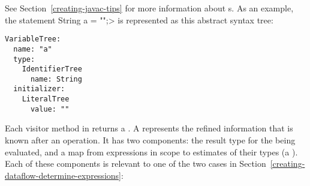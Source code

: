See Section~\ref{creating-javac-tips} for more information about s.
As an example, the statement \<String a = "";> is represented as this
abstract syntax tree:
\begin{Verbatim}
VariableTree:
  name: "a"
  type:
    IdentifierTree
      name: String
  initializer:
    LiteralTree
      value: ""
\end{Verbatim}




\begin{sloppypar}
Each visitor method in 
returns a .  A
 represents the
refined information that is known after an operation.  It has two
components:  the result type for the 
being evaluated, and a map from expressions in scope to estimates of their
types (a ).  Each of these components is
relevant to one of the two cases in
Section~\ref{creating-dataflow-determine-expressions}:
\end{sloppypar}

